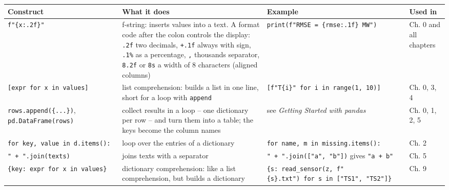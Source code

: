 \documentclass[
  letterpaper,
  DIV=11,
  numbers=noendperiod]{scrreprt}
\begin{document}
\begin{longtable}[]{@{}
  >{\raggedright\arraybackslash}p{}
  >{\raggedright\arraybackslash}p{}
  >{\raggedright\arraybackslash}p{}
  >{\raggedright\arraybackslash}p{}@{}}
\toprule\noalign{}
\begin{minipage}[b]{\linewidth}\raggedright
Construct
\end{minipage} & \begin{minipage}[b]{\linewidth}\raggedright
What it does
\end{minipage} & \begin{minipage}[b]{\linewidth}\raggedright
Example
\end{minipage} & \begin{minipage}[b]{\linewidth}\raggedright
Used in
\end{minipage} \\
\midrule\noalign{}
\endhead
\bottomrule\noalign{}
\endlastfoot
\texttt{f"\{x:.2f\}"} & f-string: inserts values into a text. A format
code after the colon controls the display: \texttt{.2f} two decimals,
\texttt{+.1f} always with sign, \texttt{.1\%} as a percentage,
\texttt{,} thousands separator, \texttt{8.2f} or \texttt{8s} a width of
8 characters (aligned columns) &
\texttt{print(f"RMSE\ =\ \{rmse:.1f\}\ MW")} & Ch. 0 and all chapters \\
\texttt{{[}expr\ for\ x\ in\ values{]}} & list comprehension: builds a
list in one line, short for a loop with \texttt{append} &
\texttt{{[}f"T\{i\}"\ for\ i\ in\ range(1,\ 10){]}} & Ch. 0, 3, 4 \\
\texttt{rows.append(\{...\})}, \texttt{pd.DataFrame(rows)} & collect
results in a loop -- one dictionary per row -- and turn them into a
table; the keys become the column names & see \emph{Getting Started with
pandas} & Ch. 0, 1, 2, 5 \\
\texttt{for\ key,\ value\ in\ d.items():} & loop over the entries of a
dictionary & \texttt{for\ name,\ m\ in\ missing.items():} & Ch. 2 \\
\texttt{"\ +\ ".join(texts)} & joins texts with a separator &
\texttt{"\ +\ ".join({[}"a",\ "b"{]})} gives \texttt{"a\ +\ b"} & Ch.
5 \\
\texttt{\{key:\ expr\ for\ x\ in\ values\}} & dictionary comprehension:
like a list comprehension, but builds a dictionary &
\texttt{\{s:\ read\_sensor(z,\ f"\{s\}.txt")\ for\ s\ in\ {[}"TS1",\ "TS2"{]}\}}
& Ch. 9 \\
\end{longtable}
\end{document}
